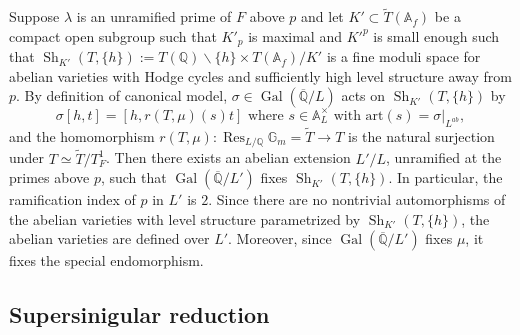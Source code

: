 \documentclass{amsart}
\numberwithin{equation}{subsection}
\numberwithin{theorem}{section}
\theoremstyle{definition}
\theoremstyle{remark}
\newcommand{\bA}{\mathbb{A}}
\newcommand{\bG}{\mathbb{G}}
\newcommand{\bQ}{\mathbb{Q}}
\DeclareMathOperator{\Gal}{Gal}
\DeclareMathOperator{\Res}{Res}
\DeclareMathOperator{\Sh}{Sh}
\begin{document}
Suppose $\lambda$ is an unramified prime of $F$ above $p$ and let $K'\subset \widetilde{T}(\bA_f)$ be a compact open subgroup such that $K'_p$ is maximal and $K'^p$ is small enough such that $\Sh_{K'}(T, \{h\}) := T(\bQ) \backslash \{h\} \times T(\bA_f) / K'$ is a fine moduli space  for abelian varieties with Hodge cycles and sufficiently high level structure away from $p$. By definition of canonical model, $\sigma \in \Gal(\overline{\bQ}/L)$ acts on $\Sh_{K'}(T, \{h\})$ by \[\sigma [h, t] = [h, r(T,\mu)(s)t] \text{ where } s\in \bA_{L}^\times \text{ with } \mathrm{art}(s) = \sigma|_{L^{ab}},\] and the homomorphism $r(T, \mu): \Res_{L/\bQ}\bG_m = \widetilde{T} \to T $ is the natural surjection under $T \simeq \widetilde{T}/T_F^1$. Then there exists an abelian extension $L'/L$, unramified at the primes above $p$, such that $\Gal(\overline{\bQ}/L')$ fixes $\Sh_{K'}(T, \{h\})$. 
In particular, the ramification index of $p$ in $L'$ is $2$. 
Since there are no nontrivial automorphisms of the abelian varieties with level structure parametrized by $\Sh_{K'}(T, \{h\})$, the abelian varieties are defined over $L'$. 
Moreover, since $\Gal(\overline{\bQ}/L')$ fixes $\mu$, it fixes the special endomorphism.   

\subsection{Supersinigular reduction}
\end{document}

